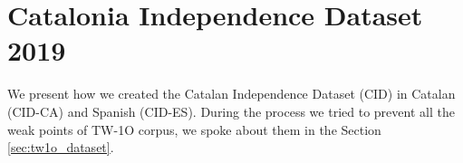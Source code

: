 \documentclass[10pt, a4paper]{article}
\begin{document}









\section{Catalonia Independence Dataset 2019}\label{sec:independence}

We present how we created the Catalan Independence Dataset (CID) in Catalan (CID-CA) and Spanish (CID-ES). During the process we tried to prevent all the weak points of TW-1O corpus, we spoke about them in the Section \ref{sec:tw1o_dataset}.
\end{document}
